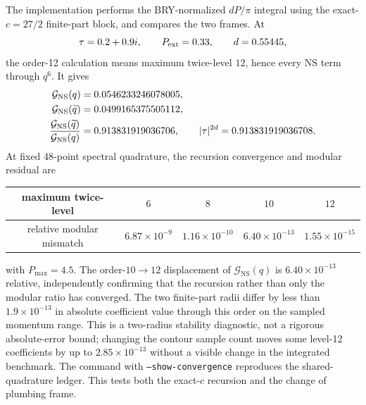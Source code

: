 \documentclass[11pt]{article}
\newcommand{\NS}{\mathrm{NS}}
\begin{document}
The implementation
 performs the BRY-normalized
$dP/\pi$ integral using the exact-$c=27/2$ finite-part block, and
 compares the two frames.
At
\[
 \tau=0.2+0.9i,\qquad P_{\rm ext}=0.33,\qquad d=0.55445,
\]
the order-12 calculation means maximum twice-level $12$, hence every NS
term through $q^6$.  It gives
\begin{align}
 \mathcal G_{\NS}(q)&=0.0546233246078005,\notag\\
 \mathcal G_{\NS}(\widetilde q)&=0.0499165375505112,\notag\\
 \frac{\mathcal G_{\NS}(\widetilde q)}
 {\mathcal G_{\NS}(q)}
 &=0.913831919036706,\qquad
 |\tau|^{2d}=0.913831919036708.
 \label{eq:torus-one-point-modular-anchor}
\end{align}
At fixed 48-point spectral quadrature, the recursion convergence and modular
residual are
\begin{center}
\begin{tabular}{c|cccc}
maximum twice-level & $6$ & $8$ & $10$ & $12$\\
\hline
relative modular mismatch
&$6.87\times10^{-9}$&$1.16\times10^{-10}$
&$6.40\times10^{-13}$&$1.55\times10^{-15}$
\end{tabular}
\end{center}
with $P_{\max}=4.5$.  The order-$10\to12$ displacement of
$\mathcal G_{\NS}(q)$ is $6.40\times10^{-13}$ relative, independently
confirming that the recursion rather than only the modular ratio has
converged.  The two finite-part radii differ by less than
$1.9\times10^{-13}$ in absolute coefficient value through this order on the
sampled momentum range.  This is a two-radius stability diagnostic, not a
rigorous absolute-error bound; changing the contour sample count moves some
level-12 coefficients by up to $2.85\times10^{-13}$ without a visible change
in the integrated benchmark.  The command
 with
\texttt{--show-convergence} reproduces the shared-quadrature ledger.  This
tests both the exact-$c$ recursion and the change of plumbing frame.
\end{document}
